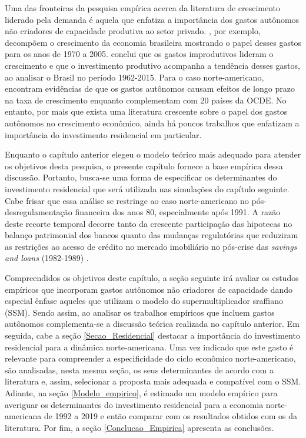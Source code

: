 Uma das fronteiras da pesquisa empírica acerca da literatura de crescimento liderado pela demanda é aquela que enfatiza a importância dos gastos autônomos não criadores de capacidade produtiva ao setor privado. \textcite{freitas_pattern_2013}, por exemplo, decompõem o crescimento da economia brasileira mostrando o papel desses gastos para os anos de  1970 a 2005. \textcite{braga_investment_2018} conclui que os gastos improdutivos lideram o crescimento e que o investimento produtivo acompanha a tendência desses gastos, ao analisar o Brasil no período 1962-2015. Para o caso norte-americano, \textcite{girardi_long-run_2016} encontram evidências de que os gastos autônomos causam efeitos de longo prazo na taxa de crescimento enquanto \textcite{girardi_autonomous_2018} complementam com 20 países da OCDE. No entanto, por mais que exista uma literatura crescente sobre o papel dos gastos autônomos no crescimento econômico, ainda há poucos trabalhos que enfatizam a importância do investimento residencial em particular. 

Enquanto o capítulo anterior elegeu o modelo teórico mais adequado para atender os objetivos desta pesquisa, o presente capítulo fornece a base empírica dessa discussão. Portanto, busca-se uma forma de especificar os determinantes do investimento residencial que será utilizada nas simulações do capítulo seguinte. 
Cabe frisar que essa análise se restringe ao caso norte-americano no pós-desregulamentação financeira dos anos 80, especialmente após 1991. 
A razão deste recorte temporal decorre tanto da crescente participação das hipotecas no balanço patrimonial dos bancos \cite{jorda_great_2014} quanto das mudanças regulatórias que reduziram as restrições ao acesso de crédito no mercado imobiliário no pós-crise das \textit{savings and loans} (1982-1989) \cites{linneman_impacts_1989}{duca_empirical_1991}{federal_deposit_insurance_corporation_savings_1997}. 


Compreendidos os objetivos deste capítulo, a seção seguinte irá avaliar os estudos empíricos que incorporam gastos autônomos não criadores de capacidade dando especial ênfase aqueles que utilizam o modelo do supermultiplicador sraffiano (SSM). Sendo assim, ao analisar os trabalhos empíricos que incluem gastos autônomos complementa-se a discussão teórica realizada no capítulo anterior. 
Em seguida, cabe a seção \ref{Secao_Residencial} destacar a importância do investimento residencial para a dinâmica norte-americana. 
Uma vez indicado que este gasto é relevante para compreender a especificidade do ciclo econômico norte-americano, são analisadas, nesta mesma seção, os seus determinantes de acordo com a literatura e, assim, selecionar a proposta mais adequada e compatível com o SSM.
Adiante, na seção \ref{Modelo_empirico}, é estimado um modelo empírico para averiguar os determinantes do investimento residencial para a economia norte-americana de 1992 a 2019 e então comparar com os resultados obtidos com os da literatura. Por fim, a seção \ref{Conclucao_Empirica} apresenta as conclusões.